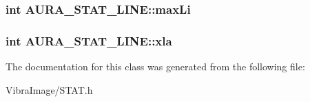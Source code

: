 \hypertarget{class_a_u_r_a___s_t_a_t___l_i_n_e_a14c3362ef902d8c9184b745b5482a011}{
\subsubsection[{max\+Li}]{\setlength{\rightskip}{0pt plus 5cm}int A\+U\+R\+A\+\_\+\+S\+T\+A\+T\+\_\+\+L\+I\+N\+E\+::max\+Li}}\label{class_a_u_r_a___s_t_a_t___l_i_n_e_a14c3362ef902d8c9184b745b5482a011}




\hypertarget{class_a_u_r_a___s_t_a_t___l_i_n_e_a42c234346457efdd753d71f9305fcf77}{
\subsubsection[{xla}]{\setlength{\rightskip}{0pt plus 5cm}int A\+U\+R\+A\+\_\+\+S\+T\+A\+T\+\_\+\+L\+I\+N\+E\+::xla}}\label{class_a_u_r_a___s_t_a_t___l_i_n_e_a42c234346457efdd753d71f9305fcf77}






The documentation for this class was generated from the following file\+:\begin{DoxyCompactItemize}
\item 
Vibra\+Image/S\+T\+A\+T.\+h\end{DoxyCompactItemize}
